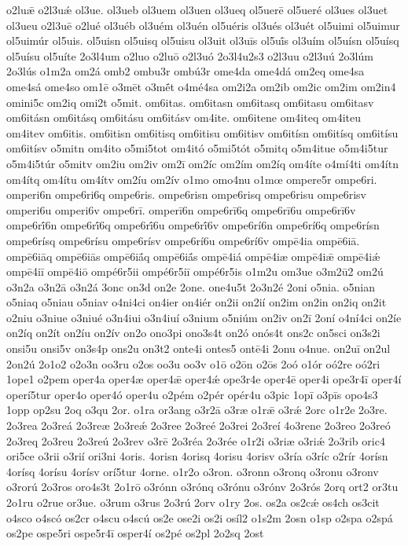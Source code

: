 {o2luǣ
o2l3uǽ
ol3ue.
ol3ueb
ol3uem
ol3uen
ol3ueq
ol5uerē
ol5ueré
ol3ues
ol3uet
ol3ueu
o2l3uē
o2lué
ol3uéb
ol3uém
ol3uén
ol5uéris
ol3ués
ol3uét
ol5uimi
ol5uimur
ol5uimúr
ol5uis.
ol5uisn
ol5uisq
ol5uisu
ol3uit
ol3uīs
ol5uī́s
ol3uím
ol5uísn
ol5uísq
ol5uísu
ol5uíte
2o3l4um
o2luo
o2luō
o2l3uó
2o3l4u2s3
o2l3uu
o2l3uú
2o3lúm
2o3lús
o1m2a
om2á
omb2
ombu3r
ombú3r
ome4da
ome4dá
om2eq
ome4sa
ome4sá
ome4so
om1ē
o3mēt
o3mḗt
o4mé4sa
om2i2a
om2ib
om2ic
om2im
om2in4
omini5c
om2iq
omi2t
o5mit.
om6itas.
om6itasn
om6itasq
om6itasu
om6itasv
om6itásn
om6itásq
om6itásu
om6itásv
om4ite.
om6itene
om4iteq
om4iteu
om4itev
om6itis.
om6itisn
om6itisq
om6itisu
om6itisv
om6itísn
om6itísq
om6itísu
om6itísv
o5mitn
om4ito
o5mi5tot
om4itó
o5mi5tót
o5mitq
o5m4itue
o5m4i5tur
o5m4i5túr
o5mitv
om2iu
om2iv
om2ī
om2íc
om2ím
om2íq
om4íte
o4mí4ti
om4ítn
om4ítq
om4ítu
om4ítv
om2íu
om2ív
o1mo
omo4nu
o1mœ
ompere5r
ompe6ri.
omperi6n
ompe6ri6q
ompe6ris.
ompe6risn
ompe6risq
ompe6risu
ompe6risv
omperi6u
omperi6v
ompe6rī.
omperī6n
ompe6rī6q
ompe6rī6u
ompe6rī6v
ompe6rī́6n
ompe6rī́6q
ompe6rī́6u
ompe6rī́6v
ompe6rí6n
ompe6rí6q
ompe6rísn
ompe6rísq
ompe6rísu
ompe6rísv
ompe6rí6u
ompe6rí6v
ompē4ia
ompē6iā.
ompē6iāq
ompē6iās
ompē6iā́q
ompē6iā́s
ompē4iá
ompē4iæ
ompē4iǣ
ompē4iǽ
ompē4iī
ompē4iō
ompé6r5ii
ompé6r5iī
ompé6r5is
o1m2u
om3ue
o3m2ū2
om2ú
o3n2a
o3n2ā
o3n2á
3onc
on3d
on2e
2one.
one4u5t
2o3n2é
2oni
o5nia.
o5nian
o5niaq
o5niau
o5niav
o4ni4ci
on4ier
on4iér
on2ii
on2ií
on2im
on2in
on2iq
on2it
o2niu
o3niue
o3niué
o3n4iui
o3n4iuí
o3nium
o5niúm
on2iv
on2ī
2oní
o4ní4ci
on2íe
on2íq
on2ít
on2íu
on2ív
on2o
ono3pi
ono3s4t
on2ó
onós4t
ons2c
on5sci
on3s2i
onsi5u
onsi5v
on3s4p
ons2u
on3t2
onte4i
ontes5
ontē4i
2onu
o4nue.
on2uī
on2ul
2on2ú
2o1o2
o2o3n
oo3ru
o2os
oo3u
oo3v
o1ō
o2ōn
o2ōs
2oó
o1ór
oó2re
oó2ri
1ope1
o2pem
oper4a
oper4æ
oper4ǣ
oper4ǽ
ope3r4e
oper4ē
oper4i
ope3r4ī
oper4í
operí5tur
oper4o
oper4ó
oper4u
o2pém
o2pér
opér4u
o3pic
1opī
o3pīs
opo4s3
1opp
op2su
2oq
o3qu
2or.
o1ra
or3ang
o3r2ā
o3ræ
o1rǣ
o3rǽ
2orc
o1r2e
2o3re.
2o3rea
2o3reá
2o3reæ
2o3reǽ
2o3ree
2o3reé
2o3rei
2o3reí
4o3rene
2o3reo
2o3reó
2o3req
2o3reu
2o3reú
2o3rev
o3rē
2o3réa
2o3rée
o1r2i
o3riæ
o3riǽ
2o3rib
oric4
ori5ce
o3rii
o3rií
ori3ni
4oris.
4orisn
4orisq
4orisu
4orisv
o3ría
o3ríc
o2rír
4orísn
4orísq
4orísu
4orísv
orí5tur
4orne.
o1r2o
o3ron.
o3ronn
o3ronq
o3ronu
o3ronv
o3rorú
2o3ros
oro4s3t
2o1rō
o3rónn
o3rónq
o3rónu
o3rónv
2o3rós
2orq
ort2
or3tu
2o1ru
o2rue
or3ue.
o3rum
o3rus
2o3rú
2orv
o1ry
2os.
os2a
os2cǽ
os4ch
os3cit
o4sco
o4scó
os2cr
o4scu
o4scú
os2e
ose2i
os2i
osíl2
o1s2m
2osn
o1sp
o2spa
o2spá
os2pe
ospe5ri
ospe5r4ī
osper4í
os2pé
os2pl
2o2sq
2ost
}
